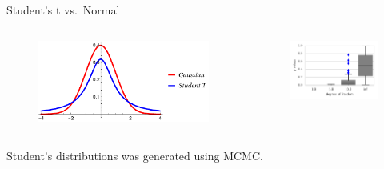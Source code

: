 \documentclass{beamer}
\begin{document}
  \begin{frame}{Student's t vs.~Normal}
\begin{columns}
        \begin{column}{.5\textwidth}
        \begin{figure}
           \includegraphics[width=\textwidth]{img/nt}   
        \end{figure}
        \end{column}
        \begin{column}{.5\textwidth}
            \begin{figure}
           \includegraphics[width=\textwidth]{img/sgld_student_opt} 
        \end{figure}
        \end{column}
    \end{columns}
Student's distributions was generated using MCMC.
\end{frame}
\end{document}
